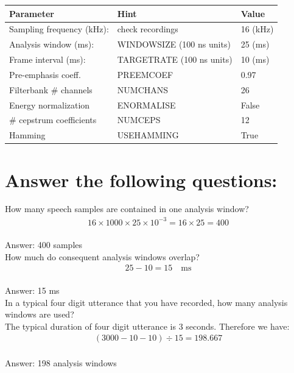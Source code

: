 \documentclass[onecolumn]{article}
\begin{document}
\begin{tabular}{|l|l|l|}
\hline
Parameter & Hint & Value \\ \hline
Sampling frequency (kHz): & check recordings          & \hfill 16 (kHz) \\
Analysis window (ms):     & WINDOWSIZE (100 ns units) & \hfill 25 (ms) \\
Frame interval (ms):      & TARGETRATE (100 ns units) & \hfill 10 (ms) \\
Pre-emphasis coeff.       & PREEMCOEF                 &  0.97 \\
Filterbank \# channels    & NUMCHANS                  &  26  \\
Energy normalization      & ENORMALISE                &  False  \\
\# cepstrum coefficients  & NUMCEPS                   &  12  \\
Hamming                   & USEHAMMING                &  True  \\
\hline
\end{tabular}

\section*{Answer the following questions:}
How many speech samples are contained in one analysis window?
\\
\begin{align*}
    16 \times 1000 \times 25 \times  10^{-3} = 16 \times  25
    = 400
\end{align*}
\\
Answer: 400 samples
\\[3mm]
How much do consequent analysis windows overlap?
\\
\begin{align*}
    25 - 10 = 15 \quad \text{ms}
\end{align*}
\\
Answer: 15 ms
\\[3mm]
In a typical four digit utterance that you have recorded, how many analysis windows are used?
\\
The typical duration of four digit utterance is 3 seconds.
Therefore we have:
\begin{align*}
    (3000 - 10 - 10) \div 15 = 198.667
\end{align*}
\\
Answer: 198 analysis windows 
\\[1mm]
\end{document}
